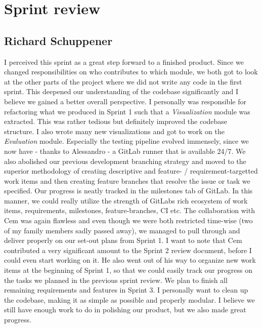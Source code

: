 \documentclass[12pt,a4paper]{article}
\begin{document}
\section{Sprint review}

\subsection{Richard Schuppener}
I perceived this sprint as a great step forward to a finished product. Since we changed responsibilities on who contributes to which module, we both got to look at the other parts of the project where we did not write any code in the first sprint. This deepened our understanding of the codebase significantly and I believe we gained a better overall perspective. I personally was responsible for refactoring what we produced in Sprint 1 such that a \textit{Visualization} module was extracted. This was rather tedious but definitely improved the codebase structure. I also wrote many new visualizations and got to work on the \textit{Evaluation} module. Especially the testing pipeline evolved immensely, since we now have - thanks to Alessandro - a GitLab runner that is available 24/7. We also abolished our previous development branching strategy and moved to the superior methodology of creating descriptive and feature- / requirement-targetted work items and then creating feature branches that resolve the issue or task we specified. Our progress is neatly tracked in the milestones tab of GitLab. In this manner, we could really utilize the strength of GitLabs rich ecosystem of work items, requirements, milestones, feature-branches, CI etc.
The collaboration with Cem was again flawless and even though we were both restricted time-wise (two of my family members sadly passed away), we managed to pull through and deliver properly on our set-out plans from Sprint 1. I want to note that Cem contributed a very significant amount to the Sprint 2 review document, before I could even start working on it. He also went out of his way to organize new work items at the beginning of Sprint 1, so that we could easily track our progress on the tasks we planned in the previous sprint review. We plan to finish all remaining requirements and features in Sprint 3. I personally want to clean up the codebase, making it as simple as possible and properly modular. I believe we still have enough work to do in polishing our product, but we also made great progress.
\end{document}
